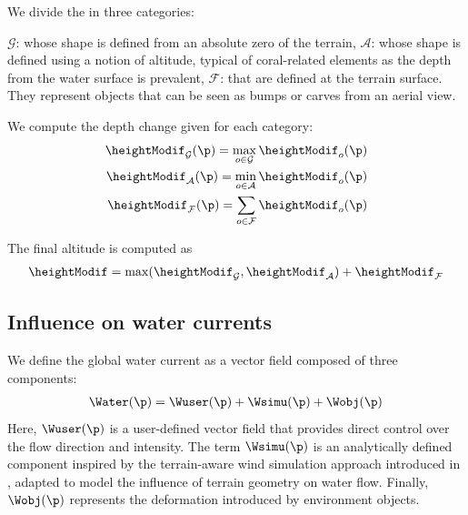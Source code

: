 We divide the  in three categories: 
\begin{Itemize}
    \Item{} $\mathcal{G}$:  whose shape is defined from an absolute zero of the terrain,
    \Item{} $\mathcal{A}$:  whose shape is defined using a notion of altitude, typical of coral-related elements as the depth from the water surface is prevalent,
    \Item{} $\mathcal{F}$:  that are defined at the terrain surface. They represent objects that can be seen as bumps or carves from an aerial view. 
\end{Itemize}


We compute the depth change given for each category:
\begin{align*}
    \heightModif_{\mathcal{G}} (\p) = \max_{o \in \mathcal{G}}{ \heightModif_o(\p) } \\
    \heightModif_{\mathcal{A}} (\p) = \min_{o \in \mathcal{A}}{ \heightModif_o(\p) } \\
    \heightModif_{\mathcal{F}} (\p) = \sum_{o \in \mathcal{F}}{ \heightModif_o(\p) }
\end{align*}

The final altitude is computed as
\begin{align}
    \heightModif = \max(\heightModif_{\mathcal{G}}, \heightModif_{\mathcal{A}}) + \heightModif_{\mathcal{F}}
\end{align}

\subsection{Influence on water currents}
\label{sec:env-obj_water-currents}

We define the global water current as a vector field composed of three components:
\begin{align}
    \Water(\p) = \Wuser(\p) + \Wsimu(\p) + \Wobj(\p)
\end{align}
Here, $\Wuser(\p)$ is a user-defined vector field that provides direct control over the flow direction and intensity. The term $\Wsimu(\p)$ is an analytically defined component inspired by the terrain-aware wind simulation approach introduced in \citep{Paris2019b}, adapted to model the influence of terrain geometry on water flow. Finally, $\Wobj(\p)$ represents the deformation introduced by environment objects.

